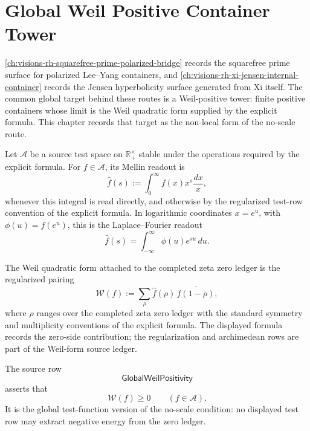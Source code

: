 \chapter{Global Weil Positive Container Tower}
\label{ch:visions-rh-global-weil-positive-container-tower}

\autoref{ch:visions-rh-squarefree-prime-polarized-bridge} records the
squarefree prime surface for polarized Lee--Yang containers, and
\autoref{ch:visions-rh-xi-jensen-internal-container} records the
Jensen hyperbolicity surface generated from Xi itself.  The common
global target behind these routes is a Weil-positive tower: finite
positive containers whose limit is the Weil quadratic form supplied by
the explicit formula.  This chapter records that target as the
non-local form of the no-scale route.

\begin{definition}
\label{def:rh-multiplicative-test-row}
Let $\mathcal A$ be a source test space on
$\mathbb R_{+}^{\times}$ stable under the operations required by the
explicit formula.  For $f\in\mathcal A$, its Mellin readout is
$$
\widehat f(s)
:=
\int_0^\infty f(x)x^s\frac{dx}{x},
$$
whenever this integral is read directly, and otherwise by the
regularized test-row convention of the explicit formula.  In logarithmic
coordinates $x=e^u$, with $\phi(u)=f(e^u)$, this is the Laplace--Fourier
readout
$$
\widehat f(s)
=
\int_{-\infty}^{\infty}\phi(u)e^{su}\,du.
$$
\end{definition}

\begin{definition}
\label{def:rh-weil-quadratic-form-row}
The Weil quadratic form attached to the completed zeta zero ledger is
the regularized pairing
$$
\mathcal W(f)
:=
\sum_{\rho}
\widehat f(\rho)\,
\overline{\widehat f(1-\overline{\rho})},
$$
where $\rho$ ranges over the completed zeta zero ledger with the
standard symmetry and multiplicity conventions of the explicit formula.
The displayed formula records the zero-side contribution; the
regularization and archimedean rows are part of the Weil-form source
ledger.
\end{definition}

\begin{definition}
\label{def:rh-global-weil-positivity}
The source row
$$
\mathsf{GlobalWeilPositivity}
$$
asserts that
$$
\mathcal W(f)\ge0
\qquad
(f\in\mathcal A).
$$
It is the global test-function version of the no-scale condition: no
displayed test row may extract negative energy from the zero ledger.
\end{definition}

